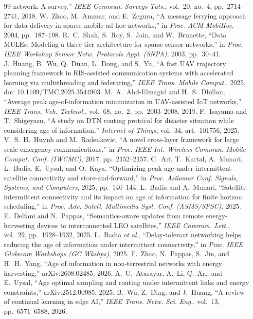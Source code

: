 \documentclass[twocolumn,3p,times,procedia]{elsarticle}
\begin{document}
\begin{thebibliography}{99}
network: A survey,'' \emph{IEEE Commun. Surveys Tuts.}, vol.~20, no.~4,
pp.~2714--2741, 2018.
W.~Zhao, M.~Ammar, and E.~Zegura, ``A message ferrying approach for data
delivery in sparse mobile ad hoc networks,'' in \emph{Proc. ACM MobiHoc},
2004, pp.~187--198.
R.~C.~Shah, S.~Roy, S.~Jain, and W.~Brunette, ``Data MULEs: Modeling a
three-tier architecture for sparse sensor networks,'' in \emph{Proc. IEEE
Workshop Sensor Netw. Protocols Appl. (SNPA)}, 2003, pp.~30--41.
J.~Huang, B.~Wu, Q.~Duan, L.~Dong, and S.~Yu, ``A fast UAV trajectory
planning framework in RIS-assisted communication systems with accelerated
learning via multithreading and federating,'' \emph{IEEE Trans. Mobile
Comput.}, 2025, doi: 10.1109/TMC.2025.3544903.
M.~A.~Abd-Elmagid and H.~S.~Dhillon, ``Average peak age-of-information
minimization in UAV-assisted IoT networks,'' \emph{IEEE Trans. Veh.
Technol.}, vol.~68, no.~2, pp.~2003--2008, 2019.
F.~Isayama and T.~Shigeyasu, ``A study on DTN routing protocol for disaster
situation while considering age of information,'' \emph{Internet of
Things}, vol.~34, art.~101756, 2025.
V.~S.~H.~Huynh and M.~Radenkovic, ``A novel cross-layer framework for large
scale emergency communications,'' in \emph{Proc. IEEE Int. Wireless
Commun. Mobile Comput. Conf. (IWCMC)}, 2017, pp.~2152--2157.
C.~Ari, T.~Kartal, A.~Munari, L.~Badia, E.~Uysal, and O.~Kaya, ``Optimizing
peak age under intermittent satellite connectivity and store-and-forward,''
in \emph{Proc. Asilomar Conf. Signals, Systems, and Computers}, 2025,
pp.~140--144.
L.~Badia and A.~Munari, ``Satellite intermittent connectivity and its
impact on age of information for finite horizon scheduling,'' in
\emph{Proc. Adv. Satell. Multimedia Syst. Conf. (ASMS/SPSC)}, 2025.
E.~Delfani and N.~Pappas, ``Semantics-aware updates from remote
energy-harvesting devices to interconnected LEO satellites,''
\emph{IEEE Commun. Lett.}, vol.~29, pp.~1928--1932, 2025.
L.~Badia \emph{et al.}, ``Delay-tolerant networking helps reducing the age
of information under intermittent connectivity,'' in \emph{Proc. IEEE
Globecom Workshops (GC Wkshps)}, 2025.
F.~Zhao, N.~Pappas, S.~Jin, and H.~H.~Yang, ``Age of information in
non-terrestrial networks with energy harvesting,'' arXiv:2608.02485,
2026.
A.~U.~Atasayar, A.~Li, {\c C}.~Ar{\i}, and E.~Uysal, ``Age optimal
sampling and routing under intermittent links and energy constraints,''
arXiv:2512.00985, 2025.
B.~Wu, Z.~Ding, and J.~Huang, ``A review of continual learning in edge
AI,'' \emph{IEEE Trans. Netw. Sci. Eng.}, vol.~13, pp.~6571--6588, 2026.
\end{thebibliography}
\end{document}
